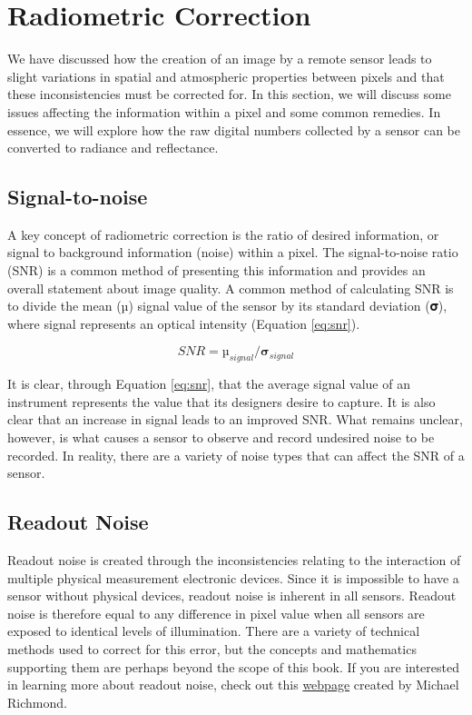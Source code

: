 \documentclass[
]{book}
\begin{document}
\section{Radiometric Correction}\label{radiometric-correction}

We have discussed how the creation of an image by a remote sensor leads to slight variations in spatial and atmospheric properties between pixels and that these inconsistencies must be corrected for. In this section, we will discuss some issues affecting the information within a pixel and some common remedies. In essence, we will explore how the raw digital numbers collected by a sensor can be converted to radiance and reflectance.

\subsection{Signal-to-noise}\label{signal-to-noise}

A key concept of radiometric correction is the ratio of desired information, or signal to background information (noise) within a pixel. The signal-to-noise ratio (SNR) is a common method of presenting this information and provides an overall statement about image quality. A common method of calculating SNR is to divide the mean (µ) signal value of the sensor by its standard deviation (𝛔), where signal represents an optical intensity (Equation \eqref{eq:snr}).

\begin{equation}
SNR = µ _{signal} /𝛔 _{signal}
\label{eq:snr}
\end{equation}

It is clear, through Equation \eqref{eq:snr}, that the average signal value of an instrument represents the value that its designers desire to capture. It is also clear that an increase in signal leads to an improved SNR. What remains unclear, however, is what causes a sensor to observe and record undesired noise to be recorded. In reality, there are a variety of noise types that can affect the SNR of a sensor.

\subsection{Readout Noise}\label{readout-noise}

Readout noise is created through the inconsistencies relating to the interaction of multiple physical measurement electronic devices. Since it is impossible to have a sensor without physical devices, readout noise is inherent in all sensors. Readout noise is therefore equal to any difference in pixel value when all sensors are exposed to identical levels of illumination. There are a variety of technical methods used to correct for this error, but the concepts and mathematics supporting them are perhaps beyond the scope of this book. If you are interested in learning more about readout noise, check out this \href{http://spiff.rit.edu/classes/phys445/lectures/readout/readout.html}{webpage} created by Michael Richmond.
\end{document}
